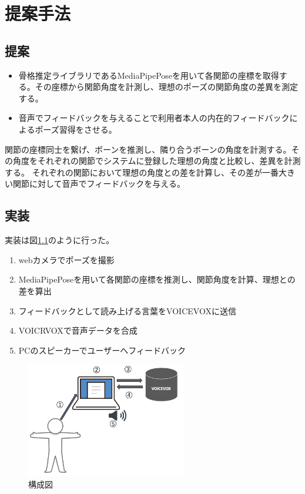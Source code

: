 \chapter{提案手法}
\label{proposed}
\section{提案}
\begin{itemize}
  \item 骨格推定ライブラリであるMediaPipePose\cite{mediapipe_pose_landmarker}を用いて各関節の座標を取得する。その座標から関節角度を計測し、理想のポーズの関節角度の差異を測定する。
  \item 音声でフィードバックを与えることで利用者本人の内在的フィードバックによるポーズ習得をさせる。
\end{itemize}
関節の座標同士を繋げ、ボーンを推測し、隣り合うボーンの角度を計測する。その角度をそれぞれの関節でシステムに登録した理想の角度と比較し、差異を計測する。
それぞれの関節において理想の角度との差を計算し、その差が一番大きい関節に対して音声でフィードバックを与える。

\section{実装}
実装は図\ref{fig:system_figure}のように行った。
\begin{enumerate}
  \item webカメラでポーズを撮影
  \item MediaPipePoseを用いて各関節の座標を推測し、関節角度を計算、理想との差を算出
  \item フィードバックとして読み上げる言葉をVOICEVOXに送信
  \item VOICRVOXで音声データを合成
  \item PCのスピーカーでユーザーへフィードバック
  \end{enumerate}

  \begin{figure}[H]
    \begin{center}
      \includegraphics[width=7cm]{figures/system_figure.png}
      \caption{構成図}
      \label{fig:system_figure}
    \end{center}
  \end{figure}  

